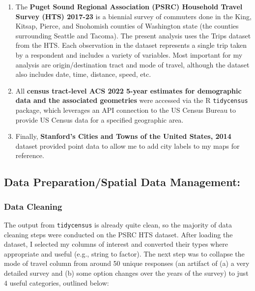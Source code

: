 \documentclass[
]{article}
\providecommand{\tightlist}{%
  \setlength{\itemsep}{0pt}\setlength{\parskip}{0pt}}
\begin{document}
\begin{enumerate}
\def\labelenumi{\arabic{enumi}.}
\tightlist
\item
  The \textbf{Puget Sound Regional Association (PSRC) Household Travel
  Survey (HTS) 2017-23} is a biennial survey of commuters done in the
  King, Kitsap, Pierce, and Snohomish counties of Washington state (the
  counties surrounding Seattle and Tacoma). The present analysis uses
  the Trips dataset from the HTS. Each observation in the dataset
  represents a single trip taken by a respondent and includes a variety
  of variables. Most important for my analysis are origin/destination
  tract and mode of travel, although the dataset also includes date,
  time, distance, speed, etc.
\item
  All \textbf{census tract-level ACS 2022 5-year estimates for
  demographic data and the associated geometries} were accessed via the
  R \texttt{tidycensus} package, which leverages an API connection to
  the US Census Bureau to provide US Census data for a specified
  geographic area.
\item
  Finally, \textbf{Stanford's Cities and Towns of the United States,
  2014} dataset provided point data to allow me to add city labels to my
  maps for reference.
\end{enumerate}

\subsection{Data Preparation/Spatial Data
Management:}\label{data-preparationspatial-data-management}

\subsubsection{Data Cleaning}\label{data-cleaning}

The output from \texttt{tidycensus} is already quite clean, so the
majority of data cleaning steps were conducted on the PSRC HTS dataset.
After loading the dataset, I selected my columns of interest and
converted their types where appropriate and useful (e.g., string to
factor). The next step was to collapse the mode of travel column from
around 50 unique responses (an artifact of (a) a very detailed survey
and (b) some option changes over the years of the survey) to just 4
useful categories, outlined below:
\end{document}
